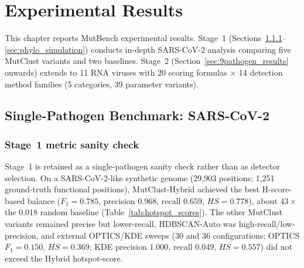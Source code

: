 \chapter{Experimental Results}
\label{ch:results}

This chapter reports MutBench experimental results.
Stage~1 (Sections~\ref{sec:variant_comparison}--\ref{sec:phylo_simulation}) conducts in-depth SARS-CoV-2 analysis comparing five MutClust variants and two baselines.
Stage~2 (Section~\ref{sec:9pathogen_results} onwards) extends to 11 RNA viruses with 20 scoring formulas $\times$ 14 detection method families (5 categories, 39 parameter variants).

\noindent{}
\vspace{0.5em}

\section{Single-Pathogen Benchmark: SARS-CoV-2}
\label{sec:single_pathogen_benchmark}

\subsection{Stage~1 metric sanity check}
\label{sec:variant_comparison}
\label{sec:multi_gt}
\label{sec:real_gisaid_benchmark}

Stage~1 is retained as a single-pathogen sanity check rather than as detector selection. On a SARS-CoV-2-like synthetic genome (29,903 positions; 1,251 ground-truth functional positions), MutClust-Hybrid achieved the best H-score-based balance ($F_1=0.785$, precision $0.968$, recall $0.659$, $\mathit{HS}=0.778$), about $43\times$ the $0.018$ random baseline (Table~\ref{tab:hotspot_scores}). The other MutClust variants remained precise but lower-recall, HDBSCAN-Auto was high-recall/low-precision, and external OPTICS/KDE sweeps (30 and 36 configurations; OPTICS $F_1=0.150$, $\mathit{HS}=0.369$; KDE precision $1.000$, recall $0.049$, $\mathit{HS}=0.557$) did not exceed the Hybrid hotspot-score.\label{tab:external_methods}\label{sec:external_comparison}

